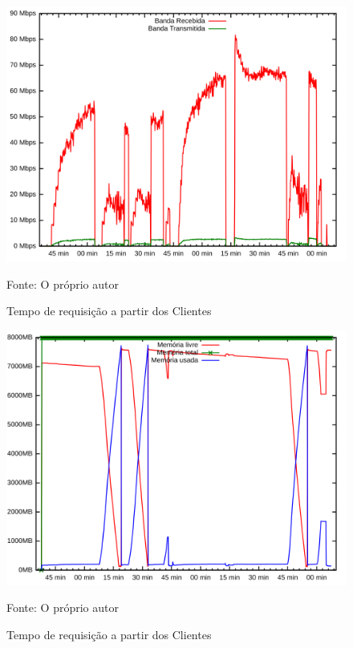 \begin{figure}[htb!]
    \caption{Tempo de requisição a partir dos Clientes}
    \includegraphics[width=\textwidth]{metricas_rudy_t3/io.png}
    \centering
    
    Fonte: O próprio autor
\end{figure}

\begin{figure}[htb!]
    \caption{Tempo de requisição a partir dos Clientes}
    \includegraphics[width=\textwidth]{metricas_rudy_t3/memory.png}
    \centering
    
    Fonte: O próprio autor
\end{figure}